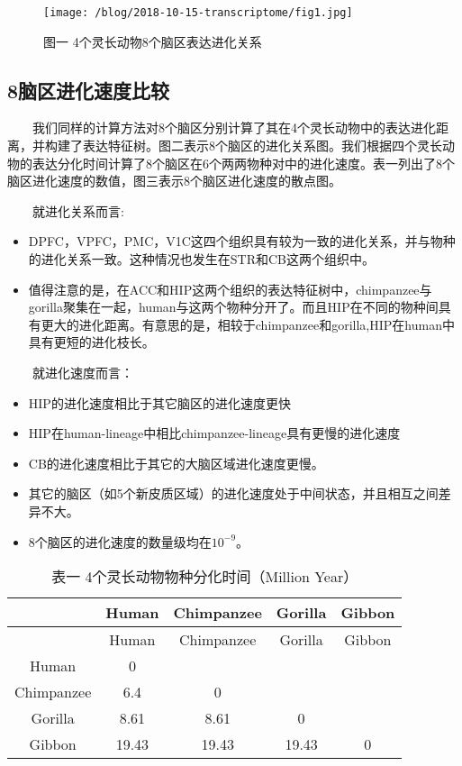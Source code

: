 \documentclass[hyperref,]{ctexart}
\providecommand{\tightlist}{%
  \setlength{\itemsep}{0pt}\setlength{\parskip}{0pt}}
\begin{document}
\begin{figure}
\centering
\texttt{[image: /blog/2018-10-15-transcriptome/fig1.jpg]}
\caption{图一 4个灵长动物8个脑区表达进化关系}
\end{figure}

\subsection{8脑区进化速度比较}

  我们同样的计算方法对8个脑区分别计算了其在4个灵长动物中的表达进化距离，并构建了表达特征树。图二表示8个脑区的进化关系图。我们根据四个灵长动物的表达分化时间计算了8个脑区在6个两两物种对中的进化速度。表一列出了8个脑区进化速度的数值，图三表示8个脑区进化速度的散点图。

  就进化关系而言:

\begin{itemize}
\tightlist
\item
  DPFC，VPFC，PMC，V1C这四个组织具有较为一致的进化关系，并与物种的进化关系一致。这种情况也发生在STR和CB这两个组织中。
\item
  值得注意的是，在ACC和HIP这两个组织的表达特征树中，chimpanzee与gorilla聚集在一起，human与这两个物种分开了。而且HIP在不同的物种间具有更大的进化距离。有意思的是，相较于chimpanzee和gorilla,HIP在human中具有更短的进化枝长。
\end{itemize}

  就进化速度而言：

\begin{itemize}
\tightlist
\item
  HIP的进化速度相比于其它脑区的进化速度更快
\item
  HIP在human-lineage中相比chimpanzee-lineage具有更慢的进化速度
\item
  CB的进化速度相比于其它的大脑区域进化速度更慢。
\item
  其它的脑区（如5个新皮质区域）的进化速度处于中间状态，并且相互之间差异不大。
\item
  8个脑区的进化速度的数量级均在\(10^{-9}\)。
\end{itemize}

\begin{longtable}[]{@{}ccccc@{}}
\caption{表一 4个灵长动物物种分化时间（Million Year）}\tabularnewline
\toprule
& Human & Chimpanzee & Gorilla & Gibbon\tabularnewline
\midrule
\endfirsthead
\toprule
& Human & Chimpanzee & Gorilla & Gibbon\tabularnewline
\midrule
\endhead
Human & 0 & & &\tabularnewline
Chimpanzee & 6.4 & 0 & &\tabularnewline
Gorilla & 8.61 & 8.61 & 0 &\tabularnewline
Gibbon & 19.43 & 19.43 & 19.43 & 0\tabularnewline
\bottomrule
\end{longtable}
\end{document}
